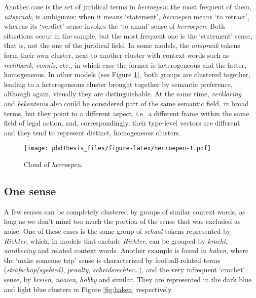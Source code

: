 \documentclass[
]{book}
\begin{document}
Another case is the set of juridical terms in \emph{herroepen}: the most frequent of them, \emph{uitspraak}, is ambiguous: when it means `statement', \emph{herroepen} means `to retract', whereas its `verdict' sense invokes the `to annul' sense of \emph{herroepen}. Both situations occur in the sample, but the most frequent one is the `statement' sense, that is, not the one of the juridical field. In some models, the \emph{uitspraak} tokens form their own cluster, next to another cluster with context words such as \emph{rechtbank}, \emph{vonnis}, etc., in which case the former is heterogeneous and the latter, homogeneous. In other models (see Figure \ref{fig:herroepen}), both groups are clustered together, leading to a heterogeneous cluster brought together by semantic preference, although again, visually they are distinguishable. At the same time, \emph{verklaring} and \emph{bekentenis} also could be considered part of the same semantic field, in broad terms, but they point to a different aspect, i.e.~a different frame within the same field of legal action, and, correspondingly, their type-level vectors are different and they tend to represent distinct, homogeneous clusters.



\begin{figure}
\centering
\texttt{[image: phdThesis\_files/figure-latex/herroepen-1.pdf]}
\caption{\label{fig:herroepen}Cloud of \emph{herroepen}.}
\end{figure}

\hypertarget{one-sense-2}{%
\subsection{One sense}\label{one-sense-2}}

A few senses can be completely clustered by groups of similar context words, as long as we don't mind too much the portion of the sense that was excluded as noise. One of these cases is the same group of \emph{schaal} tokens represented by \emph{Richter}, which, in models that exclude \emph{Richter}, can be grouped by \emph{kracht}, \emph{aardbeving} and related context words. Another example is found in \emph{haken}, where the `make someone trip' sense is characterized by football-related terms (\emph{strafschop(sgebied)}, \emph{penalty}, \emph{scheidsrechter}\ldots), and the very infrequent `crochet' sense, by \emph{breien}, \emph{naaien}, \emph{hobby} and similar. They are represented in the dark blue and light blue clusters in Figure \ref{fig:haken} respectively.
\end{document}
